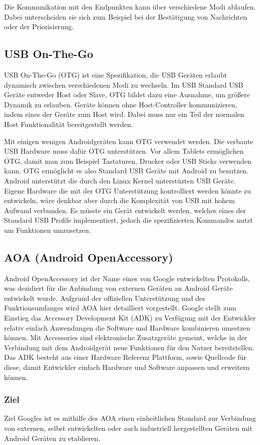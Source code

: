 \documentclass[12pt,journal,compsoc]{IEEEtran}
\begin{document}
Die Kommunikation mit den Endpunkten kann über verschiedene Modi ablaufen.
Dabei unterscheiden sie sich zum Beispiel bei der Bestätigung von Nachrichten oder der Priorisierung.  

\subsection{USB On-The-Go}
USB On-The-Go (OTG) ist eine Spezifikation, die USB Geräten erlaubt dynamisch zwischen verschiedenen Modi zu wechseln. 
Im USB Standard USB Geräte entweder Host oder Slave, OTG bildet dazu eine Ausnahme, um größere Dynamik zu erlauben.
Geräte können ohne Host-Controller kommunizieren, indem eines der Geräte zum Host wird.
Dabei muss nur ein Teil der normalen Host Funktionalität bereitgestellt werden.

Mit einigen wenigen Androidgeräten kann OTG verwendet werden. Die verbaute USB Hardware muss dafür OTG unterstützen.
Vor allem Tablets ermöglichen OTG, damit man zum Beispiel Tastaturen, Drucker oder USB Sticks verwenden kann.
OTG ermöglicht es also Standard USB Geräte mit Android zu benutzen. Android unterstützt die durch den Linux Kernel unterstüzten USB Geräte. Eigene Hardware die mit der OTG Unterstützung kontrolliert werden könnte zu entwickeln, wäre denkbar aber durch die Komplexität von USB mit hohem Aufwand verbunden.
Es müsste ein Gerät entwickelt werden, welches eines der Standard USB Profile implementiert, jedoch die spezifizierten Kommandos nutzt um Funktionen umzusetzen.


\subsection{AOA (Android OpenAccessory)}
Android OpenAccessory ist der Name eines von Google entwickelten Protokolls, was 
dezidiert für die Anbindung von externen Geräten an Android Geräte entwickelt wurde.
Aufgrund der offiziellen Unterstützung und des Funktionsumfanges wird AOA hier detailliert vorgestellt.
Google stellt zum Einstieg das Accessory Development Kit (ADK) zu Verfügung mit der Entwickler relativ einfach Anwendungen die Software und Hardware kombinieren umsetzen können.
Mit Accessories sind elektronische Zusatzgeräte gemeint, welche in der Verbindung mit dem Androidgerät neue Funktionen für den Nutzer bereitstellen.
Das ADK besteht aus einer Hardware Referenz Plattform, sowie Quellcode für diese, damit 
Entwickler einfach Hardware und Software anpassen und erweitern können.
\cite{developaoa}
\subsubsection{Ziel}
Ziel Googles ist es mithilfe des AOA einen einheitlichen Standard zur Verbindung von externen, selbst entwickelten oder auch industriell hergestellten Geräten mit Android Geräten zu etablieren.
\end{document}
